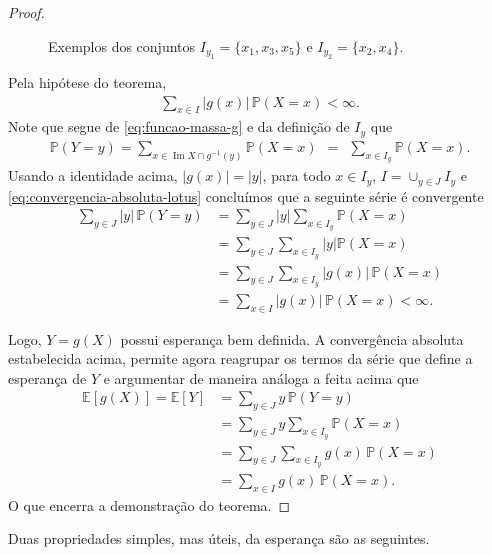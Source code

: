 \documentclass[12pt,portuguese]{article}
\theoremstyle{definition}
\begin{document}
\begin{proof}
\begin{figure}[H]
\caption{Exemplos dos conjuntos \(I_{y_1}=\{x_1,x_3,x_5\}\) e
\(I_{y_2}=\{x_2,x_4\}\).}
\end{figure}


Pela hipótese do teorema,
\begin{align}\label{eq:convergencia-absoluta-lotus}
\sum_{x\in I}|g(x)|\,\mathbb{P}(X=x)<\infty.
\end{align}
Note que segue de \eqref{eq:funcao-massa-g} e da definição de $I_{y}$ que 
\begin{align*}
\mathbb{P}(Y=y) = \sum_{x \in \operatorname{Im} X \cap g^{-1}(y)} \mathbb{P}(X = x) \ \ = \ \  \sum_{x\in I_y}\mathbb{P}(X=x).
\end{align*}
Usando a identidade acima, $|g(x)|=|y|$, para todo $x\in I_{y}$,
$I=\cup_{y\in J} I_{y}$ e \eqref{eq:convergencia-absoluta-lotus} concluímos que a seguinte série é convergente
\begin{align*}
\sum_{y\in J}|y|\,\mathbb{P}(Y=y)
&=\sum_{y\in J}|y|\sum_{x\in I_y}\mathbb{P}(X=x)\\[0.3cm]
&=\sum_{y\in J}\sum_{x\in I_y} |y|\mathbb{P}(X=x)\\[0.3cm]
&=\sum_{y\in J}\sum_{x\in I_y}|g(x)|\,\mathbb{P}(X=x)\\[0.3cm]
&=\sum_{x\in I}|g(x)|\,\mathbb{P}(X=x)<\infty.
\end{align*}

Logo, \(Y=g(X)\) possui esperança bem definida. A convergência absoluta 
estabelecida acima, permite agora reagrupar os termos da série que define a
esperança de $Y$ e argumentar de maneira análoga a feita acima que 
\begin{align*}
\mathbb{E}[g(X)] = \mathbb{E}[Y]
&=\sum_{y\in J}y\,\mathbb{P}(Y=y)\\[0.3cm]
&=\sum_{y\in J}y\sum_{x\in I_y}\mathbb{P}(X=x)\\[0.3cm]
&=\sum_{y\in J}\sum_{x\in I_y}g(x)\,\mathbb{P}(X=x)\\[0.3cm]
&=\sum_{x\in I}g(x)\,\mathbb{P}(X=x).
\end{align*}
O que encerra a demonstração do teorema.
\end{proof}

Duas propriedades simples, mas úteis, da esperança são as seguintes.
\end{document}
